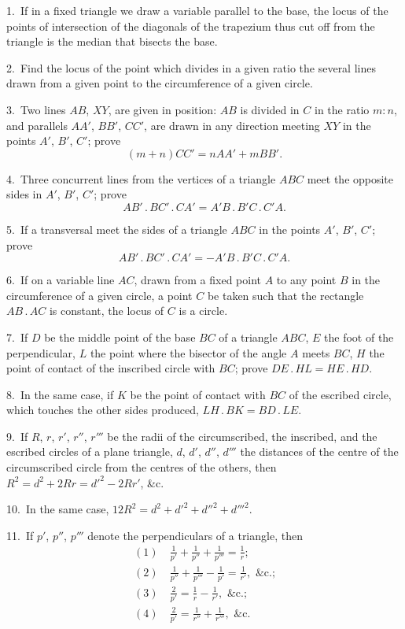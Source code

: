 \documentclass[oneside]{book}
\begin{document}
\begin{footnotesize}
1.~If in a fixed triangle we draw a variable parallel to the
base, the locus of the points of intersection of the diagonals of
the trapezium thus cut off from the triangle is the median that
bisects the base.

2.~Find the locus of the point which divides in a given ratio
the several lines drawn from a given point to the circumference
of a given circle.

3.~Two lines $AB$, $XY$, are given in position: $AB$ is divided in
$C$ in the ratio $m:n$, and parallels $AA'$, $BB'$, $CC'$, are drawn in
any direction meeting $XY$ in the points $A'$, $B'$, $C'$; prove
\[
   (m + n) CC' = n AA' + m BB'.
\]

4.~Three concurrent lines from the vertices of a triangle $ABC$
meet the opposite sides in $A'$, $B'$, $C'$; prove
\[
   AB'\,.\,BC'\,.\,CA' = A'B\,.\,B'C\,.\,C'A.
\]

5.~If a transversal meet the sides of a triangle $ABC$ in the
points $A'$, $B'$, $C'$; prove
\[
   AB'\,.\,BC'\,.\,CA' = - A'B\,.\,B'C\,.\,C'A.
\]

6.~If on a variable line $AC$, drawn from a fixed point $A$ to any
point $B$ in the circumference of a given circle, a point $C$ be taken
such that the rectangle $AB\,.\,AC$ is constant, the locus of $C$ is a
circle.

7.~If $D$ be the middle point of the base $BC$ of a triangle $ABC$,
$E$ the foot of the perpendicular, $L$ the point where the bisector of
the angle $A$ meets $BC$, $H$ the point of contact of the inscribed
circle with $BC$; prove $DE\,.\,HL = HE\,.\,HD$.

8.~In the same case, if $K$ be the point of contact with $BC$
of the escribed circle, which touches the other sides produced,
$LH\,.\,BK = BD\,.\,LE$.

9.~If $R$, $r$, $r'$, $r''$, $r'''$ be the radii of the circumscribed, the inscribed,
and the escribed circles of a plane triangle, $d$, $d'$, $d''$, $d'''$
the distances of the centre of the circumscribed circle from the
centres of the others, then $R^2 = d^2 + 2 R r = d'^2 - 2 R r'$, \&c.

10.~In the same case, $12 R^2 = d^2 + d'^2 + d''^2 + d'''^2$.


11.~If $p'$, $p''$, $p'''$ denote the perpendiculars of a triangle, then
\begin{align*}
  (1)\ &\frac{1}{p'} + \frac{1}{p''} + \frac{1}{p'''} = \frac{1}{r} ; \\
  (2)\ &\frac{1}{p''} + \frac{1}{p'''} - \frac{1}{p'} = \frac{1}{r'} , \text{\ \&c.;} \\
  (3)\ &\frac{2}{p'} = \frac{1}{r} - \frac{1}{r'} , \text{\ \&c.;} \\
  (4)\ &\frac{2}{p'} = \frac{1}{r''} + \frac{1}{r'''} , \text{\ \&c.}
\end{align*}


\end{footnotesize}
\end{document}
